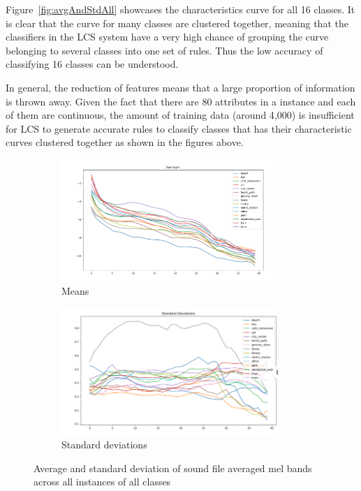 \documentclass[11pt]{article}
\begin{document}
Figure~\ref{fig:avgAndStdAll} showcases the characteristics curve for all 16 classes. It is clear that the curve for many classes are clustered together, meaning that the classifiers in the LCS system have a very high chance of grouping the curve belonging to several classes into one set of rules. Thus the low accuracy of classifying 16 classes can be understood.

In general, the reduction of features means that a large proportion of information is thrown away. Given the fact that there are 80 attributes in a instance and each of them are continuous, the amount of training data (around 4,000) is insufficient for LCS to generate accurate rules to classify classes that has their characteristic curves clustered together as shown in the figures above.


\begin{figure}[!htbp]
	\centering
	\begin{subfigure}[t]{0.48\textwidth}
		\centering
		\includegraphics[width=0.9\textwidth]{yiyang_figures/avg_all_classes.png}
		\caption{Means}
	\end{subfigure}
	\begin{subfigure}[t]{0.48\textwidth}
		\centering
		\includegraphics[width=0.9\textwidth]{yiyang_figures/stds_all_classes.png}
		\caption{Standard deviations}
	\end{subfigure}
	\caption{Average and standard deviation of sound file averaged mel bands across all instances of all classes}
	\label{fig:avgAndStd4}
\end{figure}
\end{document}
